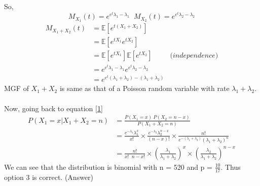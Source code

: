\documentclass{article}
\theoremstyle{remark}
\begin{document}
So,
\[
    M_{X_1}(t)= e^{e^t\lambda_1-\lambda_1} \; \; M_{X_2}(t)= e^{e^t\lambda_2-\lambda_2}
\]
\begin{align*}
    M_{X_1+X_2}(t) &= \mathbb{E} \left [ e^{t(X_1+X_2)} \right ]\\
    &= \mathbb{E} \left [ e^{tX_1} e^{tX_2} \right ]\\
    &= \mathbb{E} \left [ e^{tX_1} \right ] \mathbb{E} \left [ e^{tX_2} \right ] &\textit{(independence)}\\
    &= e^{e^t\lambda_1-\lambda_1} e^{e^t\lambda_2-\lambda_2}\\
    &= e^{e^t(\lambda_1+\lambda_2)-(\lambda_1+\lambda_2)}
\end{align*}
MGF of $X_1+X_2$ is same as that of a Poisson random variable with rate $\lambda_1+\lambda_2$.\\ \\
Now, going back to equation \eqref{1}
\begin{align*}
    P(X_1 = x | X_1+X_2 = n) &= \frac{P(X_1=x)\:P(X_2=n-x)}{P(X_1+X_2=n)} \\
    &= \frac{e^{-\lambda_1}{\lambda_1^x}}{x!} \times \frac{e^{-\lambda_2}{\lambda_2^{n-x}}}{(n-x)!} \times \frac{n!}{e^{-(\lambda_1+\lambda_2)}{(\lambda_1+\lambda_2)^n}} \\
    &= \frac{n!}{x!\;\;n-x!} \times \left ( \frac{\lambda_1}{\lambda_1+\lambda_2} \right )^x \times \left ( \frac{\lambda_2}{\lambda_1+\lambda_2} \right )^{n-x}
\end{align*}
We can see that the distribution is binomial with n = 520 and p = $\frac{10}{17}$. Thus option 3 is correct. (Answer)
\end{document}
